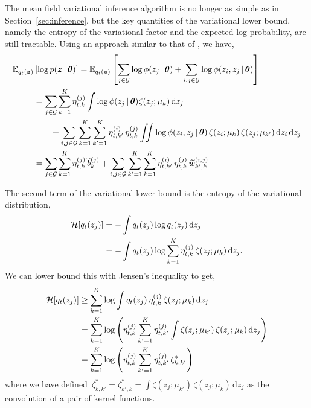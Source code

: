 The mean field variational inference algorithm is no longer as simple as in
Section~\ref{sec:inference}, but the key quantities of the variational
lower bound, namely the entropy of the variational factor and the
expected log probability, are still tractable. Using an approach similar
to that of \citet{gershman2012nonparametric}, we have,
\begin{align*}
  \mathbb{E}_{q_t(\boldsymbol{z})} &\left[ \log p(\boldsymbol{z} \,|\, \boldsymbol{\theta}) \right] 
  = \mathbb{E}_{q_t(\boldsymbol{z})} \left[ \sum_{j \in \mathcal{G}}\log \phi(z_j \,|\, \boldsymbol{\theta}) +
    \sum_{i,j \in \mathcal{G}} \log \phi(z_i, z_j \,|\, \boldsymbol{\theta}) \right] \\
  \nonumber
  &= \sum_{j \in \mathcal{G}} \sum_{k=1}^K \eta_{t,k}^{(j)} \int \log \phi(z_j \,|\, \boldsymbol{\theta}) \zeta(z_j; \mu_k) \, \mathrm{d}z_j \\
  &\qquad +
  \sum_{i,j \in \mathcal{G}} \sum_{k=1}^K \sum_{k'=1}^K \eta_{t,k'}^{(i)} \, \eta_{t,k}^{(j)} 
  \iint \log \phi(z_i, z_j \,|\, \boldsymbol{\theta}) \, \zeta(z_i; \mu_k) \, \zeta(z_j; \mu_{k'}) \, \mathrm{d}z_i \, \mathrm{d}z_j  \\
  &= \sum_{j \in \mathcal{G}} \sum_{k=1}^K \eta_{t,k}^{(j)} \, \widetilde{b}_k^{(j)} +
  \sum_{i,j \in \mathcal{G}} \sum_{k'=1}^K \sum_{k=1}^K \eta_{t,k'}^{(i)} \, \eta_{t,k}^{(j)} \,
  \widetilde{w}_{k',k}^{(i,j)}
\end{align*}

The second term of the variational lower bound is the entropy of the
variational distribution,
\begin{align*}
  \mathcal{H}[q_t(z_j)] &= -\int q_t(z_j) \log q_t(z_j) \, \mathrm{d}z_j \\
  &= -\int q_t(z_j) \log \sum_{k=1}^K \eta_{t,k}^{(j)} \, \zeta(z_j; \mu_k) \, \mathrm{d}z_j.
\end{align*}
We can lower bound this with Jensen's inequality to get,
\begin{align*}
  \mathcal{H}[q_t(z_j)] &\geq \sum_{k=1}^K \log \int q_t(z_j) \, \eta_{t,k}^{(j)} \, \zeta(z_j; \mu_k) \, \mathrm{d} z_j \\
  &= \sum_{k=1}^K \log \left( \eta_{t,k}^{(j)} \sum_{k'=1}^K \eta_{t,k'}^{(j)} \int  \zeta(z_j; \mu_{k'}) \, \zeta(z_j; \mu_k) \, \mathrm{d} z_j \right) \\
  &= \sum_{k=1}^K \log \left( \eta_{t,k}^{(j)} \sum_{k'=1}^K \eta_{t,k'}^{(j)} \, \zeta_{k,k'}^\ast \right) \\
\end{align*}
where we have defined~${\zeta_{k,k'}^\ast = \zeta_{k',k}^\ast = \int  \zeta(z_j; \mu_{k'}) \, \zeta(z_j; \mu_k) \, \mathrm{d} z_j}$ as the convolution of a pair of kernel functions.

